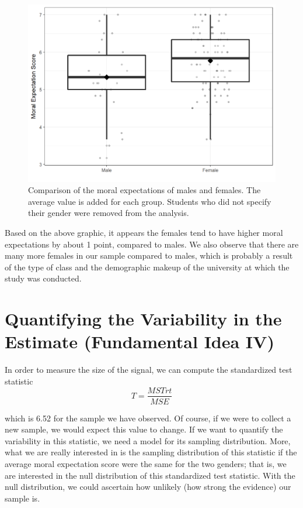 \documentclass[]{book}
\theoremstyle{definition}
\theoremstyle{definition}
\theoremstyle{definition}
\theoremstyle{remark}
\begin{document}
\begin{figure}

{\centering \includegraphics[width=0.8\linewidth]{./Images/anovarecap-boxplot-1} 

}

\caption{Comparison of the moral expectations of males and females. The average value is added for each group.  Students who did not specify their gender were removed from the analysis.}\label{fig:anovarecap-boxplot}
\end{figure}

Based on the above graphic, it appears the females tend to have higher
moral expectations by about 1 point, compared to males. We also observe
that there are many more females in our sample compared to males, which
is probably a result of the type of class and the demographic makeup of
the university at which the study was conducted.

\section{Quantifying the Variability in the Estimate (Fundamental Idea
IV)}\label{quantifying-the-variability-in-the-estimate-fundamental-idea-iv-1}

In order to measure the size of the signal, we can compute the
standardized test statistic \[T = \frac{MSTrt}{MSE}\]

which is 6.52 for the sample we have observed. Of course, if we were to
collect a new sample, we would expect this value to change. If we want
to quantify the variability in this statistic, we need a model for its
sampling distribution. More, what we are really interested in is the
sampling distribution of this statistic if the average moral expectation
score were the same for the two genders; that is, we are interested in
the null distribution of this standardized test statistic. With the null
distribution, we could ascertain how unlikely (how strong the evidence)
our sample is.
\end{document}
